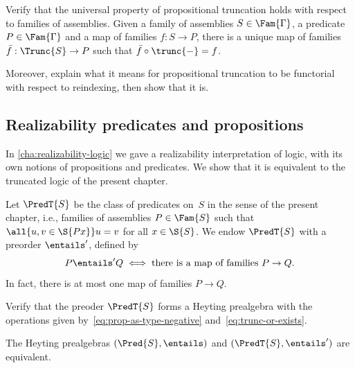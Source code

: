 \begin{exercise}
  Verify that the universal property of propositional truncation holds with respect to families of assemblies. Given a family of assemblies $S \in \Fam{\Gamma}$, a predicate $P \in \Fam{\Gamma}$ and a map of families $f : S \to P$, there is a unique map of families $\bar{f} : \Trunc{S} \to P$ such that $\bar{f} \circ \trunc{{-}} = f$.

  Moreover, explain what it means for propositional truncation to be functorial with respect to reindexing, then show that it is.
\end{exercise}


\subsection{Realizability predicates and propositions}
\label{sec:real-pred-prop}

In \cref{cha:realizability-logic} we gave a realizability interpretation of logic, with its own notions of propositions and predicates. We show that it is equivalent to the truncated logic of the present chapter.

Let $\PredT{S}$ be the class of predicates on~$S$ in the sense of the present chapter, i.e., families of assemblies $P \in \Fam{S}$ such that $\all{u, v \in \S{P x}} u = v$ for all $x \in \S{S}$. We endow $\PredT{S}$ with a preorder $\entails'$, defined by
%
\begin{equation*}
  P \entails' Q \iff
  \text{there is a map of families $P \to Q$}.
\end{equation*}
%
In fact, there is at most one map of families $P \to Q$.

\begin{exercise}
  Verify that the preoder $\PredT{S}$ forms a Heyting prealgebra with the operations given by~\eqref{eq:prop-as-type-negative} and~\eqref{eq:trunc-or-exists}.
\end{exercise}


\begin{theorem}
  \label{thm:pred-equiv-pred}
  The Heyting prealgebras $(\Pred{S}, {\entails})$ and $(\PredT{S}, {\entails'})$ are equivalent.
\end{theorem}

